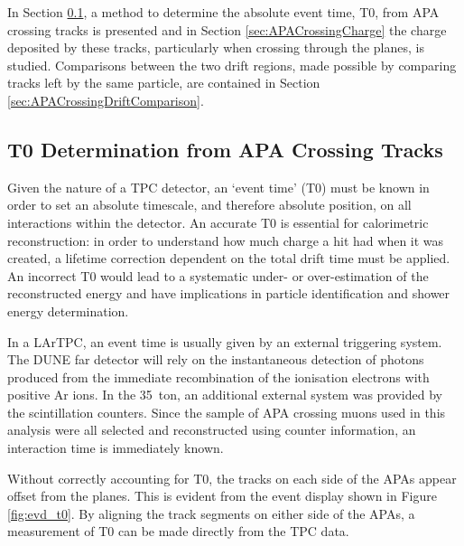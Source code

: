 In Section \ref{sec:APACrossingT0}, a method to determine the absolute event time, T0, from APA crossing tracks is presented and in Section \ref{sec:APACrossingCharge} the charge deposited by these tracks, particularly when crossing through the planes, is studied.  Comparisons between the two drift regions, made possible by comparing tracks left by the same particle, are contained in Section \ref{sec:APACrossingDriftComparison}.

\subsection{T0 Determination from APA Crossing Tracks}\label{sec:APACrossingT0}

Given the nature of a TPC detector, an `event time' (T0) must be known in order to set an absolute timescale, and therefore absolute position, on all interactions within the detector.  An accurate T0 is essential for calorimetric reconstruction: in order to understand how much charge a hit had when it was created, a lifetime correction dependent on the total drift time must be applied.  An incorrect T0 would lead to a systematic under- or over-estimation of the reconstructed energy and have implications in particle identification and shower energy determination.

In a LArTPC, an event time is usually given by an external triggering system.  The DUNE far detector will rely on the instantaneous detection of photons produced from the immediate recombination of the ionisation electrons with positive Ar ions.  In the 35~ton, an additional external system was provided by the scintillation counters.  Since the sample of APA crossing muons used in this analysis were all selected and reconstructed using counter information, an interaction time is immediately known.

Without correctly accounting for T0, the tracks on each side of the APAs appear offset from the planes.  This is evident from the event display shown in Figure \ref{fig:evd_t0}.  By aligning the track segments on either side of the APAs, a measurement of T0 can be made directly from the TPC data.

